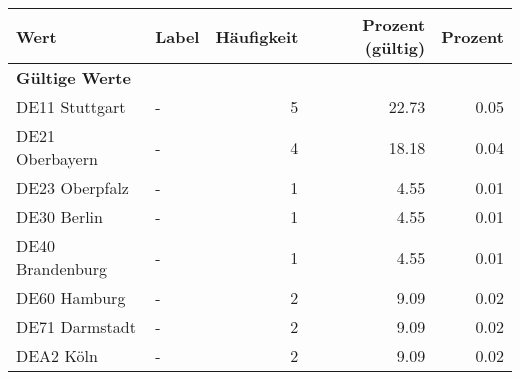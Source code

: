      \begin{longtable}{Xlrrr}
     \toprule
     \textbf{Wert} & \textbf{Label} & \textbf{Häufigkeit} & \textbf{Prozent (gültig)} & \textbf{Prozent} \\
     \endhead
     \midrule
     \multicolumn{5}{l}{\textbf{Gültige Werte}}\\

     \multicolumn{1}{X}{DE11 Stuttgart} &
     - &
     \num{5} &
     \num[round-mode=places,round-precision=2]{22.73} &
     \num[round-mode=places,round-precision=2]{0.05} \\

     \multicolumn{1}{X}{DE21 Oberbayern} &
     - &
     \num{4} &
     \num[round-mode=places,round-precision=2]{18.18} &
     \num[round-mode=places,round-precision=2]{0.04} \\

     \multicolumn{1}{X}{DE23 Oberpfalz} &
     - &
     \num{1} &
     \num[round-mode=places,round-precision=2]{4.55} &
     \num[round-mode=places,round-precision=2]{0.01} \\

     \multicolumn{1}{X}{DE30 Berlin} &
     - &
     \num{1} &
     \num[round-mode=places,round-precision=2]{4.55} &
     \num[round-mode=places,round-precision=2]{0.01} \\

     \multicolumn{1}{X}{DE40 Brandenburg} &
     - &
     \num{1} &
     \num[round-mode=places,round-precision=2]{4.55} &
     \num[round-mode=places,round-precision=2]{0.01} \\

     \multicolumn{1}{X}{DE60 Hamburg} &
     - &
     \num{2} &
     \num[round-mode=places,round-precision=2]{9.09} &
     \num[round-mode=places,round-precision=2]{0.02} \\

     \multicolumn{1}{X}{DE71 Darmstadt} &
     - &
     \num{2} &
     \num[round-mode=places,round-precision=2]{9.09} &
     \num[round-mode=places,round-precision=2]{0.02} \\

     \multicolumn{1}{X}{DEA2 Köln} &
     - &
     \num{2} &
     \num[round-mode=places,round-precision=2]{9.09} &
     \num[round-mode=places,round-precision=2]{0.02} \\


\end{longtable}

